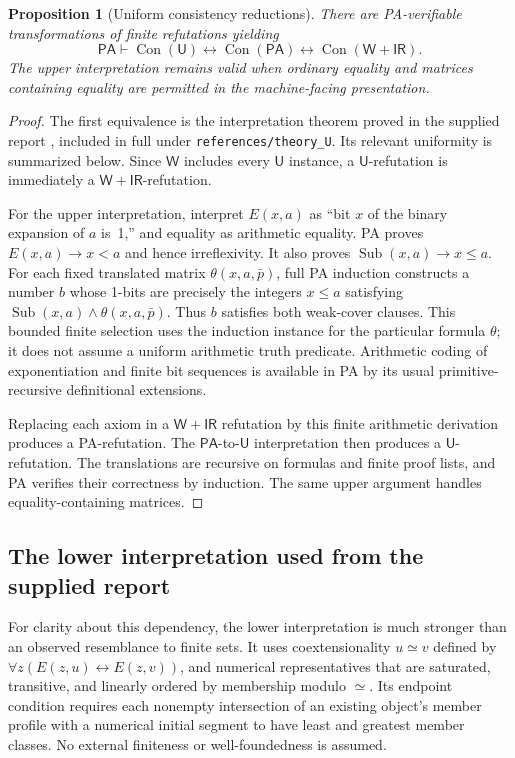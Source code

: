 \documentclass[11pt]{article}
\newcommand{\PA}{\mathsf{PA}}
\newcommand{\ThU}{\mathsf U}
\newcommand{\ThW}{\mathsf W}
\newcommand{\IR}{\mathsf{IR}}
\newcommand{\Con}{\operatorname{Con}}
\newcommand{\Sub}{\operatorname{Sub}}
\newcommand{\Eq}{\mathrel{\simeq}}
\newtheorem{proposition}[theorem]{Proposition}
\theoremstyle{definition}\newtheorem{definition}[theorem]{Definition}
\begin{document}
\begin{proposition}[Uniform consistency reductions]\label{prop:theories}
There are PA-verifiable transformations of finite refutations yielding
\[
 \PA\vdash\Con(\ThU)\leftrightarrow\Con(\PA)
                 \leftrightarrow\Con(\ThW+\IR).
\]
The upper interpretation remains valid when ordinary equality and matrices
containing equality are permitted in the machine-facing presentation.
\end{proposition}
\begin{proof}
The first equivalence is the interpretation theorem proved in the supplied
report \cite{unary}, included in full under \texttt{references/theory\_U}.
Its relevant uniformity is summarized below. Since $\ThW$ includes every
$\ThU$ instance, a $\ThU$-refutation is immediately a
$\ThW+\IR$-refutation.

For the upper interpretation, interpret $E(x,a)$ as ``bit $x$ of the
binary expansion of $a$ is~1,'' and equality as arithmetic equality. PA
proves $E(x,a)\to x<a$ and hence irreflexivity. It also proves
$\Sub(x,a)\to x\le a$. For each fixed translated matrix
$\theta(x,a,\bar p)$, full PA induction constructs a number $b$ whose
1-bits are precisely the integers $x\le a$ satisfying
$\Sub(x,a)\land\theta(x,a,\bar p)$. Thus $b$ satisfies both weak-cover
clauses. This bounded finite selection uses the induction instance for the
particular formula $\theta$; it does not assume a uniform arithmetic truth
predicate. Arithmetic coding of exponentiation and finite bit sequences is
available in PA by its usual primitive-recursive definitional extensions.

Replacing each axiom in a $\ThW+\IR$ refutation by this finite arithmetic
derivation produces a PA-refutation. The $\PA$-to-$\ThU$ interpretation
then produces a $\ThU$-refutation. The translations are recursive on
formulas and finite proof lists, and PA verifies their correctness by
induction. The same upper argument handles equality-containing matrices.
\end{proof}

\subsection{The lower interpretation used from the supplied report}

For clarity about this dependency, the lower interpretation is much stronger
than an observed resemblance to finite sets. It uses coextensionality
$u\Eq v$ defined by
$\forall z(E(z,u)\leftrightarrow E(z,v))$, and numerical representatives
that are saturated, transitive, and linearly ordered by membership modulo
$\Eq$. Its endpoint condition requires each nonempty intersection of an
existing object's member profile with a numerical initial segment to have
least and greatest member classes. No external finiteness or well-foundedness
is assumed.
\end{document}
